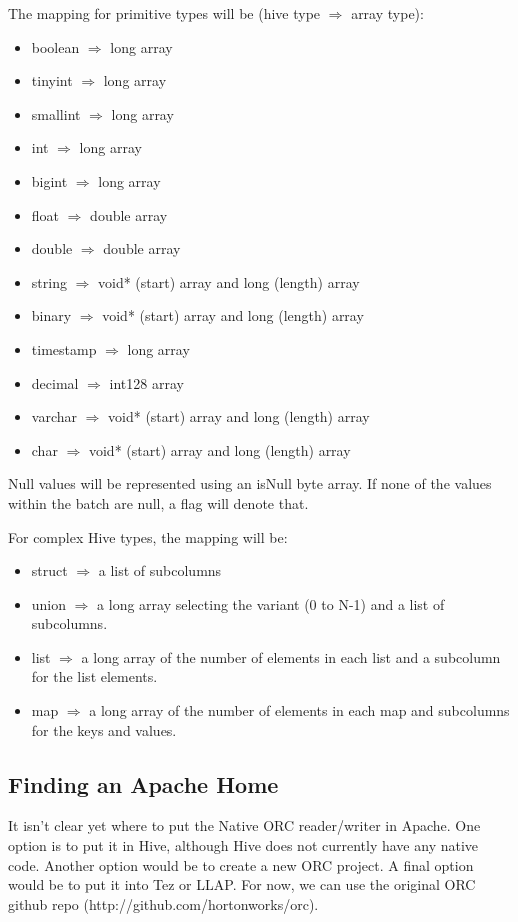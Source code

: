 \documentclass{article}
\begin{document}
The mapping for primitive types will be (hive type $\Rightarrow$ array type):
\begin{itemize}
\item boolean $\Rightarrow$ long array
\item tinyint $\Rightarrow$ long array
\item smallint $\Rightarrow$ long array
\item int $\Rightarrow$ long array
\item bigint $\Rightarrow$ long array
\item float $\Rightarrow$ double array
\item double $\Rightarrow$ double array
\item string $\Rightarrow$ void* (start) array and long (length) array
\item binary $\Rightarrow$ void* (start) array and long (length) array
\item timestamp $\Rightarrow$ long array
\item decimal $\Rightarrow$ int128 array
\item varchar $\Rightarrow$ void* (start) array and long (length) array
\item char $\Rightarrow$ void* (start) array and long (length) array
\end{itemize}

Null values will be represented using an isNull byte array. If none of
the values within the batch are null, a flag will denote that. 

For complex Hive types, the mapping will be:
\begin{itemize}
\item struct $\Rightarrow$ a list of subcolumns
\item union $\Rightarrow$ a long array selecting the variant (0 to N-1) and a
  list of subcolumns.
\item list $\Rightarrow$ a long array of the number of elements in each list 
  and a subcolumn for the list elements.
\item map $\Rightarrow$ a long array of the number of elements in each map
  and subcolumns for the keys and values.
\end{itemize}

\subsection{Finding an Apache Home}

It isn't clear yet where to put the Native ORC reader/writer in
Apache.  One option is to put it in Hive, although Hive does not
currently have any native code. Another option would be to create a
new ORC project. A final option would be to put it into Tez or
LLAP. For now, we can use the original ORC github repo
(http://github.com/hortonworks/orc).
\end{document}
